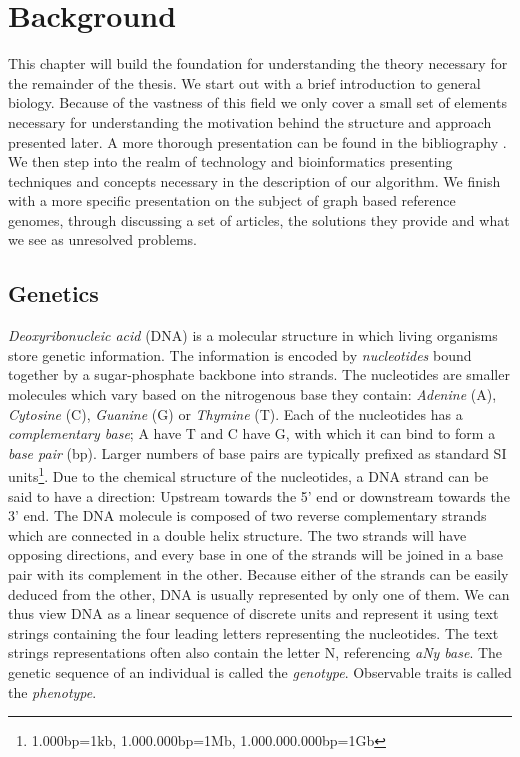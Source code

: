 \documentclass[thesis.tex]{subfiles}
\begin{document}
\chapter{Background}
This chapter will build the foundation for understanding the theory necessary for the remainder of the thesis. We start out with a brief introduction to general biology. Because of the vastness of this field we only cover a small set of elements necessary for understanding the motivation behind the structure and approach presented later. A more thorough presentation can be found in the bibliography \cite[Chapter 1 \& 2]{introduction_to_bioinformatics}\cite{introduction_to_genomics}. We then step into the realm of technology and bioinformatics presenting techniques and concepts necessary in the description of our algorithm. We finish with a more specific presentation on the subject of graph based reference genomes, through discussing a set of articles, the solutions they provide and what we see as unresolved problems.
\section{Genetics}
\textit{Deoxyribonucleic acid} (DNA) is a molecular structure in which living organisms store genetic information. The information is encoded by \textit{nucleotides} bound together by a sugar-phosphate backbone into strands. The nucleotides are smaller molecules which vary based on the nitrogenous base they contain: \textit{Adenine} (A), \textit{Cytosine} (C), \textit{Guanine} (G) or \textit{Thymine} (T). Each of the nucleotides has a \textit{complementary base}; A have T and C have G, with which it can bind to form a \textit{base pair} (bp). Larger numbers of base pairs are typically prefixed as standard SI units\footnote{1.000bp=1kb, 1.000.000bp=1Mb, 1.000.000.000bp=1Gb}. Due to the chemical structure of the nucleotides, a DNA strand can be said to have a direction: Upstream towards the 5' end or downstream towards the 3' end. The DNA molecule is composed of two reverse complementary strands which are connected in a double helix structure. The two strands will have opposing directions, and every base in one of the strands will be joined in a base pair with its complement in the other. Because either of the strands can be easily deduced from the other, DNA is usually represented by only one of them. We can thus view DNA as a linear sequence of discrete units and represent it using text strings containing the four leading letters representing the nucleotides. The text strings representations often also contain the letter N, referencing \textit{aNy base}. The genetic sequence of an individual is called the \textit{genotype}. Observable traits is called the \textit{phenotype}.
\end{document}
